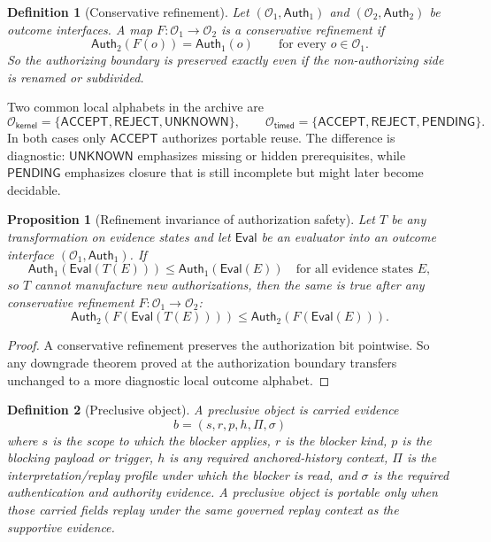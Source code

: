 \documentclass[11pt]{article}
\newtheorem{definition}{Definition}
\newtheorem{proposition}{Proposition}
\theoremstyle{remark}
\newcommand{\Acc}{\mathsf{ACCEPT}}
\newcommand{\Rej}{\mathsf{REJECT}}
\newcommand{\Unk}{\mathsf{UNKNOWN}}
\newcommand{\Eval}{\mathsf{Eval}}
\newcommand{\Pend}{\mathsf{PENDING}}
\newcommand{\Auth}{\mathsf{Auth}}
\begin{document}
\begin{definition}[Conservative refinement]
Let $(\mathcal{O}_1,\Auth_1)$ and $(\mathcal{O}_2,\Auth_2)$ be outcome interfaces.
A map $F:\mathcal{O}_1\to\mathcal{O}_2$ is a \emph{conservative refinement} if
\[
\Auth_2(F(o))=\Auth_1(o)
\qquad\text{for every }o\in\mathcal{O}_1.
\]
So the authorizing boundary is preserved exactly even if the non-authorizing side is renamed or subdivided.
\end{definition}

Two common local alphabets in the archive are
\[
\mathcal{O}_{\mathsf{kernel}}=\{\Acc,\Rej,\Unk\},
\qquad
\mathcal{O}_{\mathsf{timed}}=\{\Acc,\Rej,\Pend\}.
\]
In both cases only $\Acc$ authorizes portable reuse.
The difference is diagnostic: $\Unk$ emphasizes missing or hidden prerequisites, while $\Pend$ emphasizes closure that is still incomplete but might later become decidable.

\begin{proposition}[Refinement invariance of authorization safety]
Let $T$ be any transformation on evidence states and let $\Eval$ be an evaluator into an outcome interface $(\mathcal{O}_1,\Auth_1)$.
If
\[
\Auth_1(\Eval(T(E))) \le \Auth_1(\Eval(E))
\quad\text{for all evidence states }E,
\]
so $T$ cannot manufacture new authorizations, then the same is true after any conservative refinement $F:\mathcal{O}_1\to\mathcal{O}_2$:
\[
\Auth_2(F(\Eval(T(E)))) \le \Auth_2(F(\Eval(E))).
\]
\end{proposition}

\begin{proof}
A conservative refinement preserves the authorization bit pointwise.
So any downgrade theorem proved at the authorization boundary transfers unchanged to a more diagnostic local outcome alphabet.
\end{proof}

\begin{definition}[Preclusive object]
A \emph{preclusive object} is carried evidence
\[
  b=(s,r,p,h,\Pi,\sigma)
\]
where $s$ is the scope to which the blocker applies, $r$ is the blocker kind, $p$ is the blocking payload or trigger,
$h$ is any required anchored-history context, $\Pi$ is the interpretation/replay profile under which the blocker is read,
and $\sigma$ is the required authentication and authority evidence.
A preclusive object is portable only when those carried fields replay under the same governed replay context as the supportive evidence.
\end{definition}
\end{document}
